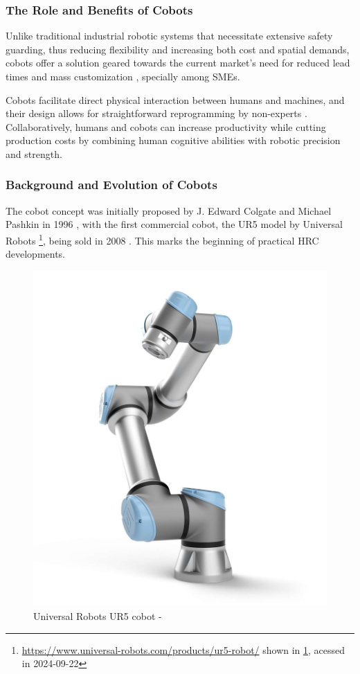 \subsubsection{The Role and Benefits of Cobots}

Unlike traditional industrial robotic systems that necessitate extensive safety guarding, thus reducing flexibility and increasing both cost and 
spatial demands, cobots offer a solution geared towards the current market's need for reduced lead times and mass customization \cite{barbazza2017agility},
specially among \ac{SMEs}. 

Cobots facilitate direct physical interaction between humans and machines, and their design allows for straightforward reprogramming by non-experts \cite{7140065}.
Collaboratively, humans and cobots can increase productivity while cutting production costs by combining human cognitive abilities with robotic precision and strength.

\subsubsection{Background and Evolution of Cobots}

The cobot concept was initially proposed by J. Edward Colgate and Michael Pashkin in 1996 \cite{cobot-definition}, with the first commercial cobot, the UR5 
model by Universal Robots \footnote{\url{https://www.universal-robots.com/products/ur5-robot/} shown in \ref{fig:ur5}, acessed in 2024-09-22}, being sold in 2008 \cite{robotics8040100}.  
This marks the beginning of practical \ac{HRC} developments.

\begin{figure}[!htbp]
    \centering
    \includegraphics[width=0.4\linewidth]{figs/ur5.jpg}
    \caption{Universal Robots UR5 cobot - \cite{jugardUniversalRobots}} 
    \label{fig:ur5}
\end{figure} 

